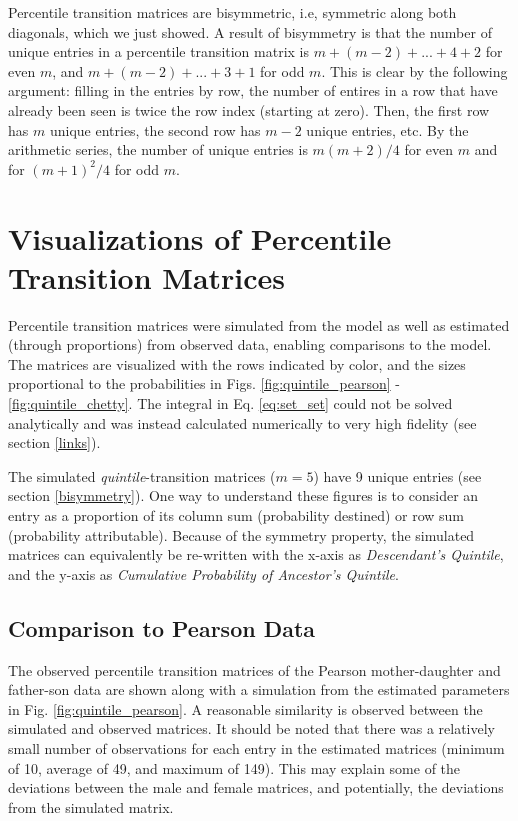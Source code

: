 \documentclass{svproc} %
\begin{document}
Percentile transition matrices are bisymmetric, i.e, symmetric along both diagonals, which we just showed. A result of bisymmetry is that the number of unique entries in a percentile transition matrix is $m + (m-2) + ... + 4 + 2$ for even $m$, and $m + (m-2) + ... + 3 + 1$ for odd $m$. This is clear by the following argument: filling in the entries by row, the number of entires in a row that have already been seen is twice the row index (starting at zero). Then, the first row has $m$ unique entries, the second row has $m-2$ unique entries, etc. By the arithmetic series, the number of unique entries is $m(m+2)/4$ for even $m$ and for $(m+1)^2/4$ for odd $m$. 



\section{Visualizations of Percentile Transition Matrices} \label{visuals}

Percentile transition matrices were simulated from the model as well as estimated (through proportions) from observed data, enabling comparisons to the model. The matrices are visualized with the rows indicated by color, and the sizes proportional to the probabilities in Figs. \ref{fig:quintile_pearson} - \ref{fig:quintile_chetty}. The integral in Eq. \ref{eq:set_set} could not be solved analytically and was instead calculated numerically to very high fidelity (see section \ref{links}). 

The simulated \emph{quintile}-transition matrices ($m = 5$) have 9 unique entries (see section \ref{bisymmetry}). One way to understand these figures is to consider an entry as a proportion of its column sum (probability destined) or row sum (probability attributable). Because of the symmetry property, the simulated matrices can equivalently be re-written with the x-axis as \emph{Descendant's Quintile}, and the y-axis as \emph{Cumulative Probability of Ancestor's Quintile}. 


\subsection{Comparison to Pearson Data}

The observed percentile transition matrices of the Pearson mother-daughter and father-son data are shown along with a simulation from the estimated parameters in Fig. \ref{fig:quintile_pearson}. A reasonable similarity is observed between the simulated and observed matrices. It should be noted that there was a relatively small number of observations for each entry in the estimated matrices (minimum of 10, average of 49, and maximum of 149). This may explain some of the deviations between the male and female matrices, and potentially, the deviations from the simulated matrix. 
\end{document}
